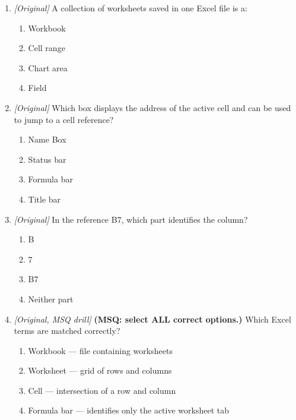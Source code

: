 \begin{enumerate}[label=\textbf{Q\arabic*.}, leftmargin=*]
\item \textit{[Original]} A collection of worksheets saved in one Excel file is a:
  \begin{enumerate}[label=\Alph*.]
\item Workbook
   \item Cell range
   \item Chart area
   \item Field
  \end{enumerate}

\item \textit{[Original]} Which box displays the address of the active cell and can be used to jump to a cell reference?
  \begin{enumerate}[label=\Alph*.]
\item Name Box
   \item Status bar
   \item Formula bar
   \item Title bar
  \end{enumerate}

\item \textit{[Original]} In the reference B7, which part identifies the column?
  \begin{enumerate}[label=\Alph*.]
\item B
   \item 7
   \item B7
   \item Neither part
  \end{enumerate}

\item \textit{[Original, MSQ drill]} \textbf{(MSQ: select ALL correct options.)} Which Excel terms are matched correctly?
  \begin{enumerate}[label=\Alph*.]
\item Workbook --- file containing worksheets
   \item Worksheet --- grid of rows and columns
   \item Cell --- intersection of a row and column
   \item Formula bar --- identifies only the active worksheet tab
  \end{enumerate}

\end{enumerate}
